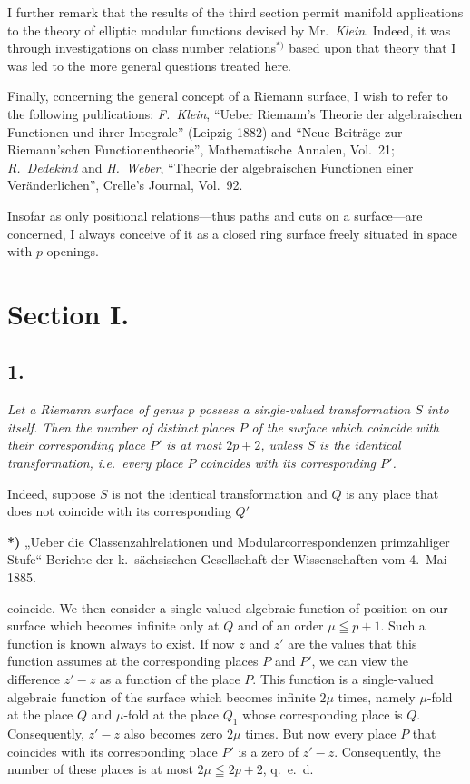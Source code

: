 \documentclass{article}
\begin{document}
I further remark that the results of the third section permit manifold applications to the theory of elliptic modular functions devised by Mr.~\emph{Klein}. Indeed, it was through investigations on class number relations${}^{*)}$ based upon that theory that I was led to the more general questions treated here.

Finally, concerning the general concept of a Riemann surface, I wish to refer to the following publications: \emph{F.~Klein}, ``Ueber Riemann's Theorie der algebraischen Functionen und ihrer Integrale'' (Leipzig 1882) and ``Neue Beiträge zur Riemann'schen Functionentheorie'', Mathematische Annalen, Vol.~21; \emph{R.~Dedekind} and \emph{H.~Weber}, ``Theorie der algebraischen Functionen einer Veränderlichen'', Crelle's Journal, Vol.~92.

Insofar as only positional relations—thus paths and cuts on a surface—are concerned, I always conceive of it as a closed ring surface freely situated in space with $p$ openings.

\section*{Section I.}

\subsection*{1.}

\emph{Let a Riemann surface of genus $p$ possess a single-valued transformation $S$ into itself. Then the number of distinct places $P$ of the surface which coincide with their corresponding place $P'$ is at most $2p+2$, unless $S$ is the identical transformation, i.e.\ every place $P$ coincides with its corresponding $P'$.}

Indeed, suppose $S$ is not the identical transformation and $Q$ is any place that does not coincide with its corresponding $Q'$

\textbf{*)} „Ueber die Classenzahlrelationen und Modularcorrespondenzen primzahliger Stufe“ Berichte der k.~sächsischen Gesellschaft der Wissenschaften vom 4.~Mai 1885.

coincide. We then consider a single-valued algebraic function of position on our surface which becomes infinite only at $Q$ and of an order $\mu \leqq p+1$. Such a function is known always to exist. If now $z$ and $z'$ are the values that this function assumes at the corresponding places $P$ and $P'$, we can view the difference $z' - z$ as a function of the place $P$. This function is a single-valued algebraic function of the surface which becomes infinite $2\mu$ times, namely $\mu$-fold at the place $Q$ and $\mu$-fold at the place $Q_1$ whose corresponding place is $Q$. Consequently, $z' - z$ also becomes zero $2\mu$ times. But now every place $P$ that coincides with its corresponding place $P'$ is a zero of $z' - z$. Consequently, the number of these places is at most $2\mu \leqq 2p+2$, q.~e.~d.
\end{document}
